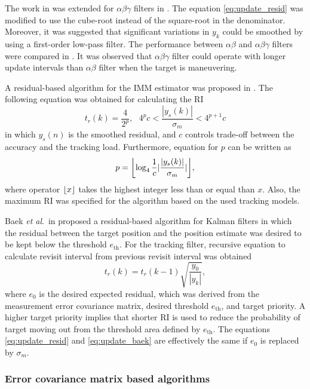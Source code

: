 \documentclass[english, 12pt, a4paper, elec, utf8, a-1b, online]{aaltothesis}
\newcommand{\etal}{\textit{et al}.~}
\newcommand{\ri}{t_r}
\DeclarePairedDelimiter\floor{\lfloor}{\rfloor}
\begin{document}
The work in \cite{Cohen1986} was extended for $\alpha\beta\gamma$ filters \cite{Brookner1998} in \cite{Gardner1988}. 
The equation \eqref{eq:update_resid} was modified to use the cube-root instead of the square-root in the denominator.
Moreover, it was suggested that significant variations in $y_k$ could be smoothed by using a first-order low-pass filter.
The performance between $\alpha\beta$ and $\alpha\beta\gamma$ filters were compared in \cite{Munu1992}.
It was observed that $\alpha\beta\gamma$ filter could operate with longer update intervals than $\alpha\beta$ filter when the target is maneuvering.

A residual-based algorithm for the IMM estimator was proposed in \cite{ChengTing2007}.
The following equation was obtained for calculating the RI
\begin{equation}
    \ri(k) = \frac{4}{2^p}, \text{ } 4^p c < \frac{|y_s(k)|}{\sigma_m} < 4^{p+1}c
\end{equation}
in which $y_s(n)$ is the smoothed residual, and $c$ controls trade-off between the accuracy and the tracking load.
Furthermore, equation for $p$ can be written as
\begin{equation}
    p = \floor*{\log_4\frac{1}{c}|\frac{|y_s(k)|}{\sigma_m}|},
\end{equation}
where operator $\floor*{x}$ takes the highest integer less than or equal than $x$.
Also, the maximum RI was specified for the algorithm based on the used tracking models.

Baek \etal in \cite{Baek2010} proposed a residual-based algorithm for Kalman filters in which the residual between the target position and the position estimate was desired to be kept below the threshold $e_\text{th}$.
For the tracking filter, recursive equation to calculate revisit interval from previous revisit interval was obtained
\begin{equation}\label{eq:update_baek}
    \ri(k) = \ri(k - 1) \sqrt{\frac{y_0}{|y_k|}},
\end{equation}
where $e_0$ is the desired expected residual, which was derived from the measurement error covariance matrix, desired threshold $e_\text{th}$, and target priority.
A higher target priority implies that shorter RI is used to reduce the probability of target moving out from the threshold area defined by $e_\text{th}$.
The equations \eqref{eq:update_resid} and \eqref{eq:update_baek} are effectively the same if $e_0$ is replaced by $\sigma_m$.


\subsubsection{Error covariance matrix based algorithms}
\end{document}
